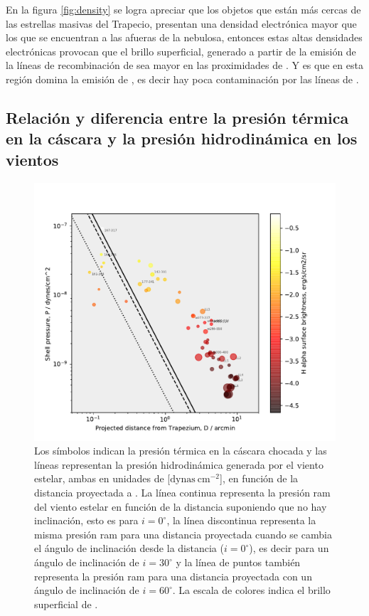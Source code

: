 En la figura \ref{fig:density} se logra apreciar que los objetos que están más cercas de las estrellas masivas del Trapecio, presentan una densidad electrónica mayor que los que se encuentran a las afueras de la nebulosa, entonces estas altas densidades electrónicas provocan que el brillo superficial, generado a partir de la emisión de la líneas de recombinación de \ha{} sea mayor en las proximidades de \thC{}. Y es que en esta región domina la emisión de \ha, es decir hay poca contaminación por las líneas de  \nii{}.\\


\subsection{Relación y diferencia entre la presión térmica en la cáscara y la presión hidrodinámica en los vientos }
\label{sec:pressure}

\begin{figure}
  \centering
  \includegraphics[width=\linewidth, clip]{luis-programas/will-Pshell-vs-D.pdf}
  \caption{Los símbolos indican la presión térmica en la cáscara chocada  y las líneas representan la presión hidrodinámica generada por el viento estelar, ambas en unidades de [\(\mathrm{dynas~cm^{-2}}\)], en función de la distancia proyectada a \thC{}. La línea continua representa la presión ram del viento estelar en función de la distancia suponiendo que no hay inclinación, esto es para \(i = 0^{\circ}\), la línea discontinua representa la misma presión ram para una distancia proyectada cuando se cambia el ángulo de inclinación desde la distancia (\(i = 0^{\circ}\)), es decir para un ángulo de inclinación de \(i = 30^{\circ}\) y la línea de puntos también representa la presión ram para una distancia proyectada con un ángulo de inclinación de \(i = 60^{\circ}\). La escala de colores indica el brillo superficial de \ha{}. }
 \label{fig:pressure}
\end{figure}

